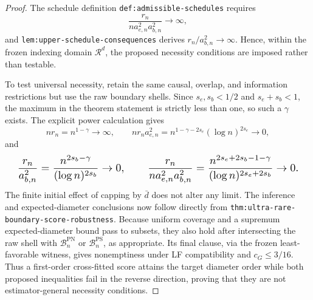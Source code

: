 \documentclass{article}
\begin{document}
\begin{proof}
The schedule definition \texttt{def:admissible-schedules} requires
\[\frac{r_n}{na_{e,n}^2a_{b,n}^2}\longrightarrow\infty,\]
and \texttt{lem:upper-schedule-consequences} derives \(r_n/a_{b,n}^2\to\infty\). Hence, within the frozen indexing domain \(\mathcal R^d\), the proposed necessity conditions are imposed rather than testable.

To test universal necessity, retain the same causal, overlap, and information restrictions but use the raw boundary shells. Since \(s_e,s_b<1/2\) and \(s_e+s_b<1\), the maximum in the theorem statement is strictly less than one, so such a \(\gamma\) exists. The explicit power calculation gives
\[nr_n=n^{1-\gamma}\to\infty,\qquad nr_na_{e,n}^2=n^{1-\gamma-2s_e}(\log n)^{2s_e}\to0,\]
and
\[
\makebox[\linewidth][c]{\resizebox{0.98\linewidth}{!}{\par\noindent \makebox[\linewidth][c]{\resizebox{0.98\linewidth}{!}{\(\displaystyle \displaystyle \frac{r_n}{a_{b,n}^2}=\frac{n^{2s_b-\gamma}}{(\log n)^{2s_b}}\to0,\qquad \frac{r_n}{na_{e,n}^2a_{b,n}^2}=\frac{n^{2s_e+2s_b-1-\gamma}}{(\log n)^{2s_e+2s_b}}\to0.\)}}\par\noindent}}
\]
The finite initial effect of capping by \(\bar d\) does not alter any limit. The inference and expected-diameter conclusions now follow directly from \texttt{thm:ultra-rare-boundary-score-robustness}. Because uniform coverage and a supremum expected-diameter bound pass to subsets, they also hold after intersecting the raw shell with \(\mathcal B_n^{\mathrm{PN}}\) or \(\mathcal B_n^{\mathrm{PS}}\), as appropriate. Its final clause, via the frozen least-favorable witness, gives nonemptiness under LF compatibility and \(c_G\le3/16\). Thus a first-order cross-fitted score attains the target diameter order while both proposed inequalities fail in the reverse direction, proving that they are not estimator-general necessity conditions.
\end{proof}
\end{document}
